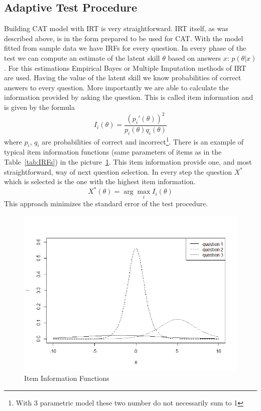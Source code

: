 \subsection{Adaptive Test Procedure}
Building CAT model with IRT is very straightforward. IRT itself, as was described above, is in the form prepared to be used for CAT. With the model fitted from sample data we have IRFs for every question. In every phase of the test we can compute an estimate of the latent skill $\theta$ based on answers $x$: $p(\theta|x)$. For this estimations Empirical Bayes or Multiple Imputation methods of IRT are used. Having the value of the latent skill we know probabilities of correct answers to every question. More importantly we are able to calculate the information provided by asking the question. This is called item information and is given by the formula
$$I_i(\theta)=\frac{(p_i'(\theta))^2}{p_i(\theta)q_i(\theta)}$$
where $p_i$, $q_i$ are probabilities of correct and incorrect\footnote{With 3 parametric model these two number do not necessarily sum to 1}. There is an example of typical item information functions (same parameters of items as in the Table~\ref{tab:IRFs}) in the picture~\ref{pic:IG}. This item information provide one, and most straightforward, way of next question selection. In every step the question $X^*$ which is selected is the one with the highest item information. 
$$X^*(\theta) = \arg\max_i I_i(\theta)$$
This approach minimizes the standard error of the test procedure.

\begin{figure}%
\includegraphics[width=\columnwidth]{obr/IIs.png}%
\caption{Item Information Functions}%
\label{pic:IG}%
\end{figure}

